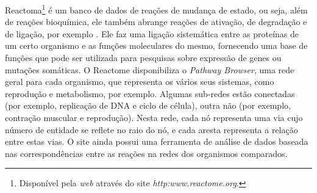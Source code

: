 \indent Reactoma\footnote{Disponível pela \textit{web} através do site \textit{http:\/\/www.reactome.org}.} é um banco de dados de reações de mudança de estado, ou seja, além de reações bioquímica, ele também abrange reações de ativação, de degradação e de ligação, por exemplo \cite{reactomeUsersguide}. Ele faz uma ligação sistemática entre as proteínas de um certo organismo e as funções moleculares do mesmo, fornecendo uma base de funções que pode ser utilizada para pesquisas sobre expressão de genes ou mutações somáticas. O Reactome disponibiliza o \textit{Pathway Browser}, uma rede geral para cada organismo, que representa os vários seus sistemas, como reprodução e metabolismo, por exemplo. Algumas sub-redes estão conectadas (por exemplo, replicação de DNA e ciclo de célula), outra não (por exemplo, contração muscular e reprodução). Nesta rede, cada nó representa uma via cujo número de entidade se reflete no raio do nó, e cada aresta representa a relação entre estas vias. O site ainda possui uma ferramenta de análise de dados baseada nas correspondências entre as reações na redes dos organismos comparados. \\